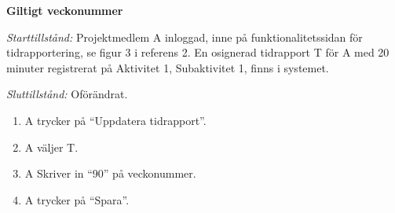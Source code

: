 \documentclass[a4paper]{article}
\begin{document}
\begin{FT}
\item\textbf{Giltigt veckonummer}

\emph{Starttillstånd:} Projektmedlem A inloggad, inne på funktionalitetssidan för tidrapportering, se figur 3 i referens 2. En osignerad tidrapport T för A med 20 minuter registrerat på Aktivitet 1, Subaktivitet 1, finns i systemet.

\emph{Sluttillstånd:} Oförändrat.

\begin{enumerate}
 \item A trycker på ``Uppdatera tidrapport''.
 \item A väljer T.
 \item A Skriver in ``90'' på veckonummer.
 \item A trycker på ``Spara''.
\end{enumerate}


\end{FT}
\end{document}

